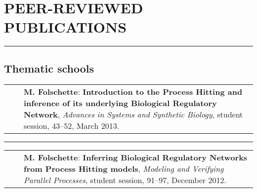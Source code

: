 \documentclass[11pt,a4paper,sans]{moderncv} %
\makeatletter
\renewcommand{\emph}{\textbf}
\newcommand{\myrule}{\vspace*{-2pt}\textcolor{color3}{\rule{\textwidth}{.5pt}}\vspace*{1pt}}
\newcommand{\mybluerule}{\vspace*{5pt}\textcolor{color1}{\rule{\textwidth}{.5pt}}\vspace*{-2pt}}
\newlength{\listitemsymbolwidthsep}
\newenvironment{publist}%
{\begin{tabular}{r@{}p{.935\textwidth}}\hspace{-\listitemsymbolwidthsep}\hspace{.45\hintscolumnwidth}}%
{\end{tabular}}
\newcommand{\newpub}[1]{\vspace{1pt}\begin{publist}\listitemsymbol~~&#1\end{publist}\vspace{1pt}}
\newcommand{\cvsectionvspace}{\vspace{.4cm}}
\newenvironment{cvsplitsection}[1]{%
  \cvsectionvspace
  \section{#1}%
}{}
\newenvironment{cvsection}[1]{%
  \cvsectionvspace
  \begin{minipage}{\textwidth}
  \section{#1}%
}{%
  \end{minipage}
}
\newenvironment{cvsubsectionrule}[1]{%
  \begin{minipage}{\textwidth}
  \mybluerule
  \subsection{#1}%
}{%
  \end{minipage}
}
\makeatother
\begin{document}
\begin{cvsplitsection}{PEER-REVIEWED PUBLICATIONS}

\begin{cvsubsectionrule}{Thematic schools}

\newpub{\emph{M. Folschette}:
  \emph{Introduction to the Process Hitting and inference of its underlying Biological Regulatory Network},
  \textit{Advances in Systems and Synthetic Biology}, student session, 43--52, March 2013.}

\myrule

\newpub{\emph{M. Folschette}:
  \emph{Inferring Biological Regulatory Networks from Process Hitting models},
  \textit{Modeling and Verifying Parallel Processes}, student session, 91--97, December 2012.}

\end{cvsubsectionrule}

\end{cvsplitsection}
\end{document}
